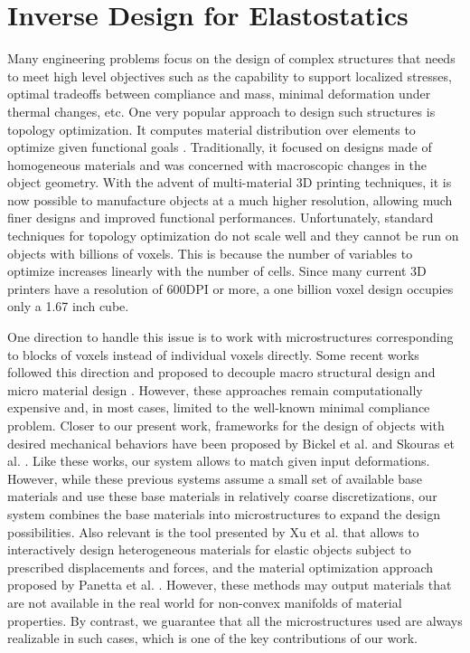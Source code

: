 \section{Inverse Design for Elastostatics}
Many engineering problems focus on the design of complex structures that needs to meet high level objectives such as the capability to support localized stresses, optimal tradeoffs between compliance and mass, minimal deformation under thermal changes, etc. One very popular approach to design such structures is topology optimization. It computes material distribution over elements to optimize given functional goals \cite{bendsoe2004topology}. Traditionally, it focused on designs made of homogeneous materials and was concerned with macroscopic changes in the object geometry.
With the advent of multi-material 3D printing techniques, it is now possible to manufacture objects at a much higher resolution, allowing much finer designs and improved functional performances.
Unfortunately, standard techniques for topology optimization do not scale well and they cannot be run on objects with billions of voxels. This is because the number of variables to optimize increases linearly with the number of cells. Since many current 3D printers have a resolution of 600DPI or more, a one billion voxel design occupies only a 1.67 inch cube.

One direction to handle this issue is to work with microstructures corresponding to blocks of voxels instead of individual voxels directly. Some recent works followed this direction and proposed to decouple macro structural design and micro material design \cite{rodrigues:2002:hierarchical,coelho:2008:hierarchical,nakshatrala:2013:nonlinear}. However, these approaches remain computationally expensive and, in most cases, limited to the well-known minimal compliance problem.
Closer to our present work, frameworks for the design of objects with desired mechanical behaviors have been proposed by Bickel et al. \cite{Bickel2010} and Skouras et al. \cite{Skouras2013}. Like these works, our system  allows to match given input deformations. However, while these previous systems assume a small set of available base materials and use these base materials in relatively coarse discretizations, our system combines the base materials into microstructures to expand the design possibilities. Also relevant is the tool presented by Xu et al. \cite{Xu2014} that allows to interactively design heterogeneous materials for elastic objects subject to prescribed displacements and forces, and the material optimization approach proposed by Panetta et al. \cite{Panetta:2015}. However, these methods may output materials that are not available in the real world for non-convex manifolds of material properties. By contrast, we guarantee that all the microstructures used are always realizable in such cases, which is one of the key contributions of our work. 